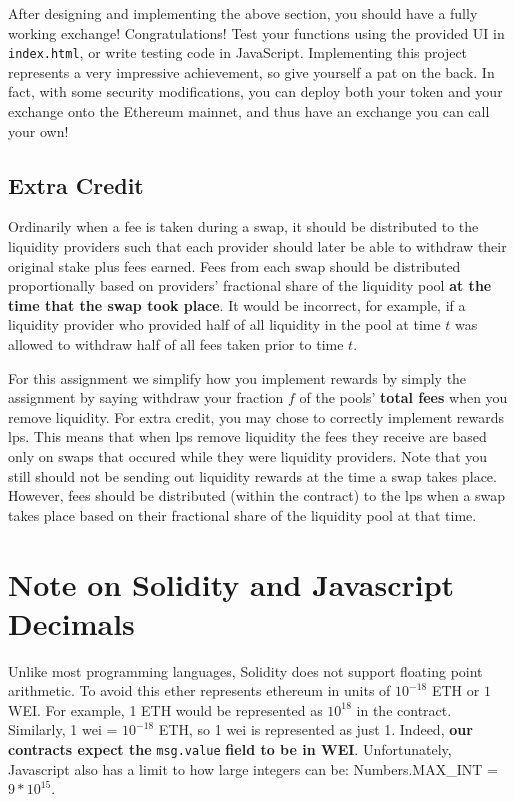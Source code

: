 \documentclass[11pt]{article}
\begin{document}
After designing and implementing the above section, you should have a fully working exchange! Congratulations! Test your functions using the provided UI in \texttt{index.html}, or write testing code in JavaScript. Implementing this project represents a very impressive achievement, so give yourself a pat on the back. In fact, with some security modifications, you can deploy both your token and your exchange onto the Ethereum mainnet, and thus have an exchange you can call your own!

\subsection{Extra Credit}
Ordinarily when a fee is taken during a swap, it should be distributed to the liquidity providers such that each provider should later be able to withdraw their original stake plus fees earned. Fees from each swap should be distributed proportionally based on providers' fractional share of the liquidity pool \textbf{at the time that the swap took place}. It would be incorrect, for example, if a liquidity provider who provided half of all liquidity in the pool at time $t$ was allowed to withdraw half of all fees taken prior to time $t$.

For this assignment we simplify how you implement rewards by simply the assignment by saying withdraw your fraction $f$ of the pools' \textbf{total fees} when you remove liquidity. For extra credit, you may chose to correctly implement rewards lps. This means that when lps remove liquidity the fees they receive are based only on swaps that occured while they were liquidity providers. Note that you still should not be sending out liquidity rewards at the time a swap takes place. However, fees should be distributed (within the contract) to the lps when a swap takes place based on their fractional share of the liquidity pool at that time.

\section{Note on Solidity and Javascript Decimals}
Unlike most programming languages, Solidity does not support floating point arithmetic. To avoid this ether represents ethereum in units of $10^{-18}$ ETH or $1$ WEI. For example, 1 ETH would be represented as $10^{18}$ in the contract. Similarly, 1 wei = $10^{-18}$ ETH, so 1 wei is represented as just 1. Indeed, \textbf{our contracts expect the} \texttt{msg.value} \textbf{field to be in WEI}. Unfortunately, Javascript also has a limit to how large integers can be: Numbers.MAX\_INT = $9 * 10^{15}$. 
\end{document}
